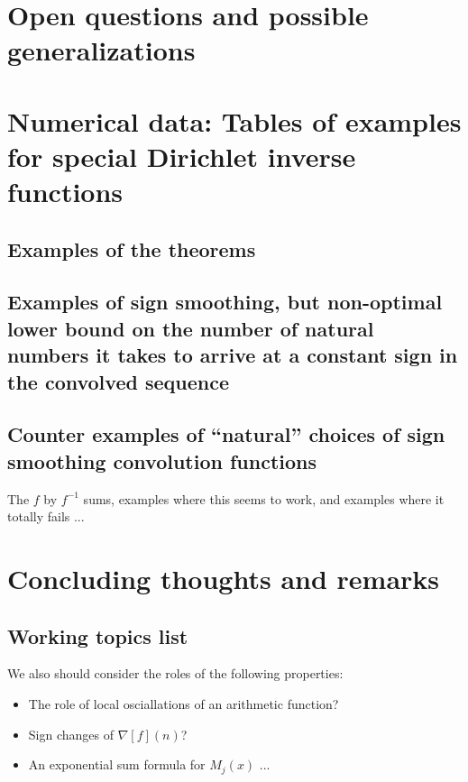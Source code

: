 \documentclass[11pt,reqno]{amsart}
\numberwithin{figure}{section}
\numberwithin{table}{section}
\theoremstyle{plain}
\numberwithin{theorem}{section}
\theoremstyle{definition}
\begin{document}
\section{Open questions and possible generalizations} 


\section{Numerical data: Tables of examples for special Dirichlet inverse functions} 

\subsection{Examples of the theorems} 

\subsection{Examples of sign smoothing, but non-optimal lower bound on the number of natural numbers 
               it takes to arrive at a constant sign in the convolved sequence} 
               
\subsection{Counter examples of ``natural'' choices of sign smoothing convolution functions} 

The $f$ by $f^{-1}$ sums, examples where this seems to work, and examples where it totally fails ... 

\section{Concluding thoughts and remarks} 

\subsection{Working topics list} 

We also should consider the roles of the following properties: 
\begin{itemize} 

\item The role of local osciallations of an arithmetic function? 
\item Sign changes of $\nabla[f](n)$? 
\item An exponential sum formula for $M_j(x)$ ... 

\end{itemize} 
\end{document}
